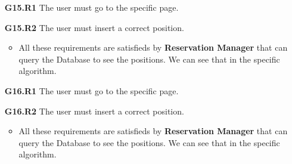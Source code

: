 \begin{itemize}
\item[\textbf{G15.R1}] The user must go to the specific page.
\item[\textbf{G15.R2}] The user must insert a correct position.
\begin{itemize}
\item All these requirements are satisfieds by \textbf{Reservation Manager} that can query the Database to see the positions. We can see that in the specific algorithm. 
\end{itemize} 

\item[\textbf{G16.R1}] The user must go to the specific page.
\item[\textbf{G16.R2}] The user must insert a correct position.
\begin{itemize}
\item All these requirements are satisfieds by \textbf{Reservation Manager} that can query the Database to see the positions. We can see that in the specific algorithm. 
\end{itemize}
\end{itemize}

